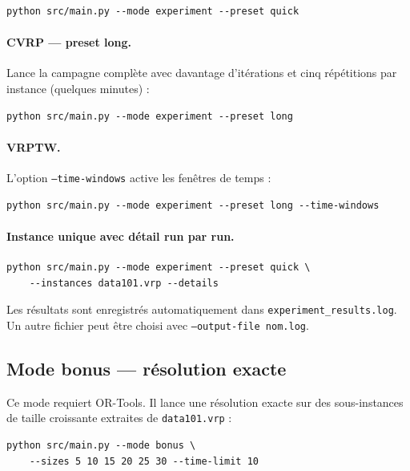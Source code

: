 \documentclass[11pt,a4paper]{article}
\begin{document}
\begin{lstlisting}
python src/main.py --mode experiment --preset quick
\end{lstlisting}

\paragraph{CVRP — preset long.}
Lance la campagne complète avec davantage d'itérations et cinq répétitions par instance (quelques minutes) :

\begin{lstlisting}
python src/main.py --mode experiment --preset long
\end{lstlisting}

\paragraph{VRPTW.}
L'option \texttt{--time-windows} active les fenêtres de temps :

\begin{lstlisting}
python src/main.py --mode experiment --preset long --time-windows
\end{lstlisting}

\paragraph{Instance unique avec détail run par run.}

\begin{lstlisting}
python src/main.py --mode experiment --preset quick \
    --instances data101.vrp --details
\end{lstlisting}

Les résultats sont enregistrés automatiquement dans \texttt{experiment\_results.log}. Un autre fichier peut être choisi avec \texttt{--output-file nom.log}.

\subsection{Mode bonus — résolution exacte}

Ce mode requiert OR-Tools. Il lance une résolution exacte sur des sous-instances de taille croissante extraites de \texttt{data101.vrp} :

\begin{lstlisting}
python src/main.py --mode bonus \
    --sizes 5 10 15 20 25 30 --time-limit 10
\end{lstlisting}
\end{document}

